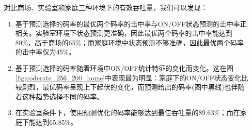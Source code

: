 对比商场、实验室和家庭三种环境下的有效吞吐量，我们可以发现：
\begin{enumerate}
	\item 基于预测选择的码率的最优两个码率的击中率与ON/OFF状态预测的击中率正相关。实验室环境下状态预测更准确，因此最优两个码率的击中率能达到80\%，高于商场的65\%；而家庭环境中状态预测不够准确，因此最优两个码率的击中率仅为45\%。
	
	\item 基于预测选择的码率随着环境中ON/OFF统计特征的变化而变化。这在图\ref{fig:coderate_256_200_home}中表现最为明显：家庭下的ON/OFF状态变化比较剧烈，最优码率呈现上下起伏的变化，而预测给出的码率(图中黑线)也伴随着这种趋势选择不同的码率。
	
	\item 在实验室条件下，使用预测优化的码率能够达到最佳吞吐量的89.63\%；而在家庭下能达到65.85\%。
\end{enumerate}
